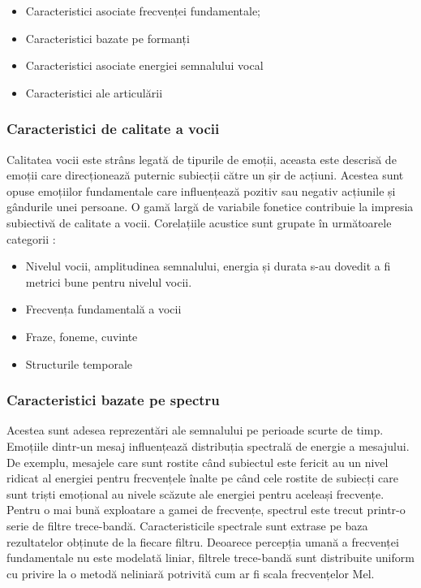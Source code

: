 \documentclass[9pt,shortpaper,twoside,web]{ieeecolor}
\begin{document}
\begin{itemize}
\item Caracteristici asociate frecvenței fundamentale;

\item Caracteristici bazate pe formanți

\item Caracteristici asociate energiei semnalului vocal

\item Caracteristici ale articulării
\end{itemize}


\subsubsection{Caracteristici de calitate a vocii}
Calitatea vocii este strâns legată de tipurile de emoții, aceasta este descrisă de emoții care direcționează puternic subiecții către un șir de acțiuni. Acestea sunt opuse emoțiilor fundamentale care influențează pozitiv sau negativ acțiunile și gândurile unei persoane. O gamă largă de variabile fonetice contribuie la impresia subiectivă de calitate a vocii. Corelațiile acustice sunt grupate în următoarele categorii \cite{b1}:

\begin{itemize}
\item Nivelul vocii, amplitudinea semnalului, energia și durata s-au dovedit a fi metrici bune pentru nivelul vocii.

\item Frecvența fundamentală a vocii

\item Fraze, foneme, cuvinte

\item Structurile temporale
\end{itemize}


\subsubsection{Caracteristici bazate pe spectru}
Acestea sunt adesea reprezentări ale semnalului pe perioade scurte de timp. Emoțiile dintr-un mesaj influențează distribuția spectrală de energie a mesajului. De exemplu, mesajele care sunt rostite când subiectul este fericit au un nivel ridicat al energiei pentru frecvențele înalte pe când cele rostite de subiecți care sunt triști emoțional au nivele scăzute ale energiei pentru aceleași frecvențe. 
Pentru o mai bună exploatare a gamei de frecvențe, spectrul este trecut printr-o serie de filtre trece-bandă. Caracteristicile spectrale sunt extrase pe baza rezultatelor obținute de la fiecare filtru. Deoarece percepția umană a frecvenței fundamentale nu este modelată liniar, filtrele trece-bandă sunt distribuite uniform cu privire la o  metodă neliniară potrivită cum ar fi scala frecvențelor Mel. 
\end{document}
